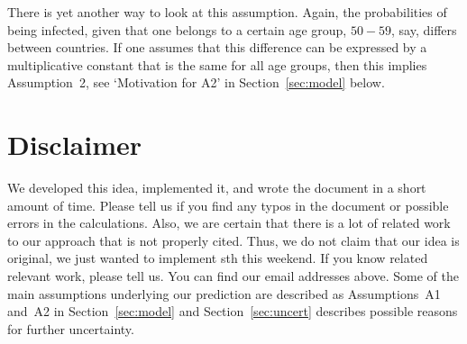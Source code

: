 \documentclass[a4paper]{article}
\begin{document}
There is yet another way to look at this assumption.
Again, the probabilities of 
being infected, given that one belongs to a certain age group, $50-59$, say, differs between countries. If one assumes
that this difference can be expressed by a multiplicative constant that is the same for all age groups, then 
this implies Assumption~2, see `Motivation for A2' in Section~\ref{sec:model} below.




\section{Disclaimer} \label{sec:disclaimer}

We 
developed this idea, implemented it, and 
wrote the 
document in a short amount of time. Please tell us if you find any typos 
in the document or possible errors in 
the calculations. 
Also, we are certain that there is a lot of 
related work to our approach that is not properly cited. 
Thus, we do not claim that our idea is original, we just wanted
to implement sth this weekend.
If you know related relevant work, please tell us.
You can find our email addresses above.
Some of the main assumptions underlying our prediction are described 
as Assumptions~A1 and~A2 in Section~\ref{sec:model} and
Section~\ref{sec:uncert} describes possible reasons for further uncertainty.
\end{document}
